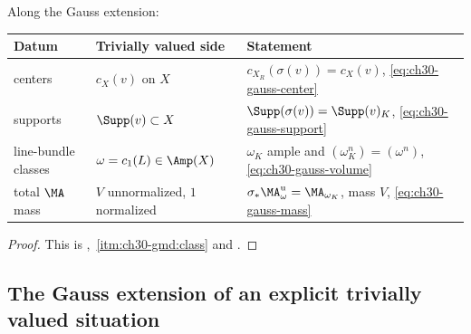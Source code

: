 \begin{corollary}
\label{cor:ch30-gauss-four-data}
Along the Gauss extension:
\begin{center}
\small
\begin{tabular}{p{}|p{}|p{}}
\toprule
\textbf{Datum}&\textbf{Trivially valued side}
 &\textbf{Statement}\\
\midrule
centers
 &\(c_X(v)\) on \(X\)
 &\(c_{X_R}(\sigma(v))=c_X(v)\),
  \eqref{eq:ch30-gauss-center}\\
supports
 &\(\Supp(v)\subset X\)
 &\(\Supp(\sigma(v))=\Supp(v)_K\),
  \eqref{eq:ch30-gauss-support}\\
line-bundle classes
 &\(\omega=c_1(L)\in\Amp(X)\)
 &\(\omega_K\) ample and
  \((\omega_K^n)=(\omega^n)\),
  \eqref{eq:ch30-gauss-volume}\\
total \(\MA\) mass
 &\(V\) unnormalized, \(1\) normalized
 &\(\sigma_*\MA^{\mathrm u}_\omega=\MA_{\omega_K}\), mass \(V\),
  \eqref{eq:ch30-gauss-mass}\\
\bottomrule
\end{tabular}
\end{center}
\end{corollary}

\begin{proof}
This is
,
\,\cref{itm:ch30-gmd:class} and
.
\end{proof}

\subsection{The Gauss extension of an explicit trivially valued situation}
\label{sec:ch30-gauss-examples}

